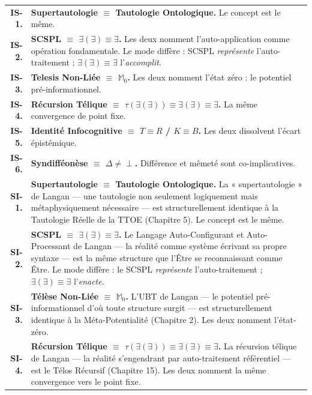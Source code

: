 \documentclass[10pt, openany, oneside]{book}
\renewcommand{\footnotesize}{\fontsize{8.5}{11}\selectfont}
\begin{document}
{\footnotesize
\noindent\begin{tabular}{r p{}}
\textbf{IS-1.} & \textbf{Supertautologie $\equiv$ Tautologie Ontologique.} Le concept est le même. \\[0.3em]
\textbf{IS-2.} & \textbf{SCSPL $\equiv$ $\exists(\exists) \equiv \exists$.} Les deux nomment l'auto-application comme opération fondamentale. Le mode diffère : SCSPL \textit{représente} l'auto-traitement ; $\exists(\exists) \equiv \exists$ l'\textit{accomplit}. \\[0.3em]
\textbf{IS-3.} & \textbf{Telesis Non-Liée $\equiv$ $\mathbb{M}_0$.} Les deux nomment l'état zéro : le potentiel pré-informationnel. \\[0.3em]
\textbf{IS-4.} & \textbf{Récursion Télique $\equiv$ $\tau(\exists(\exists)) \equiv \exists(\exists) \equiv \exists$.} La même convergence de point fixe. \\[0.3em]
\textbf{IS-5.} & \textbf{Identité Infocognitive $\equiv$ $T \equiv R$ / $K \equiv B$.} Les deux dissolvent l'écart épistémique. \\[0.3em]
\textbf{IS-6.} & \textbf{Syndifféonèse $\equiv$ $\Delta \neq \perp$.} Différence et mêmeté sont co-implicatives. \\[0.3em]
\textbf{SI-1.} & \textbf{Supertautologie $\equiv$ Tautologie Ontologique.} La « supertautologie » de Langan --- une tautologie non seulement logiquement mais métaphysiquement nécessaire --- est structurellement identique à la Tautologie Réelle de la TTOE (Chapitre 5). Le concept est le même. \\[0.3em]
\textbf{SI-2.} & \textbf{SCSPL $\equiv$ $\exists(\exists) \equiv \exists$.} Le Langage Auto-Configurant et Auto-Processant de Langan --- la réalité comme système écrivant sa propre syntaxe --- est la même structure que l'Être se reconnaissant comme Être. Le mode diffère : le SCSPL \textit{représente} l'auto-traitement ; $\exists(\exists) \equiv \exists$ l'\textit{enacte}. \\[0.3em]
\textbf{SI-3.} & \textbf{Télèse Non-Liée $\equiv$ $\mathbb{M}_0$.} L'UBT de Langan --- le potentiel pré-informationnel d'où toute structure surgit --- est structurellement identique à la Méta-Potentialité (Chapitre 2). Les deux nomment l'état-zéro. \\[0.3em]
\textbf{SI-4.} & \textbf{Récursion Télique $\equiv$ $\tau(\exists(\exists)) \equiv \exists(\exists) \equiv \exists$.} La récursion télique de Langan --- la réalité s'engendrant par auto-traitement référentiel --- est le Télos Récursif (Chapitre 15). Les deux nomment la même convergence vers le point fixe. \\[0.3em]

\end{tabular}}
\end{document}
